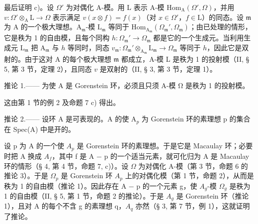 最后证明 c)。设 \(\Omega'\) 为对偶化 A-模。用 L 表示 A-模 \(\mathrm{Hom}_{\mathrm{A}}(\Omega',\Omega)\)，并用 \(v:\Omega' \otimes_{\mathrm{A}} \mathrm{L} \longrightarrow \Omega\) 表示满足 \(v(x \otimes f) = f(x)\)（对 \(x \in \Omega'\)，\(f \in \mathrm{L}\)）的同态。设 \(\mathfrak{m}\) 为 A 的一个极大理想。\(\mathrm{A}_{\mathfrak{m}}\)-模 \(\mathrm{L}_{\mathfrak{m}}\) 等同于 \(\mathrm{Hom}_{\mathrm{A}_{\mathfrak{m}}}(\Omega_{\mathfrak{m}}',\Omega_{\mathfrak{m}})\)；由已处理的情形，它是秩为 1 的自由模，且每个同构 \(h:\Omega_{\mathfrak{m}}' \to \Omega_{\mathfrak{m}}\) 都是它的一个生成元。当利用生成元 \(\mathrm{L}_{\mathfrak{m}}\) 把 \(\mathrm{A}_{\mathfrak{m}}\) 与 \(h\) 等同时，同态 \(v_{\mathfrak{m}}:\Omega_{\mathfrak{m}}' \otimes_{\mathrm{A}_{\mathfrak{m}}}\mathrm{L}_{\mathfrak{m}} \longrightarrow \Omega_{\mathfrak{m}}\) 等同于 \(h\)，因此它是双射的。由于这对 A 的每个极大理想 \(\mathfrak{m}\) 都成立，A-模 L 是秩为 1 的投射模（II, § 5, 第 3 节，定理 2），且同态 \(v\) 是双射的（II, § 3, 第 3 节，定理 1）。

推论 1.—— 为使 A 是 Gorenstein 环，必须且只须 A-模 Ω 是秩为 1 的投射模。

这由第 1 节的例 2 及命题 7 c) 得出。

推论 2.—— 设环 A 是可表现的。A 的使 A\(_{p}\) 为 Gorenstein 环的素理想 p 的集合在 Spec(A) 中是开的。

设 p 为 A 的一个使 \(A_{p}\) 是 Gorenstein 环的素理想。于是它是 Macaulay 环；必要时把 A 换成 \(A_{f}\)，其中 f 是 A − p 的一个适当元素，就可化归为 A 是 Macaulay 环的情形（§ 4, 第 4 节，命题 7, c)）。设 \(\Omega\) 为对偶化 A-模（第 3 节，命题 6 的推论 3）。于是 \(\Omega_{p}\) 是 Gorenstein 环 \(A_{p}\) 上的对偶化模（第 1 节，命题 2），从而是秩为 1 的自由模（推论 1）。因此存在 A − p 的一个元素 g，使 \(A_{g}\)-模 \(\Omega_{g}\) 是秩为 1 的自由模（II, § 5, 第 1 节，命题 2 的推论）。于是 \(A_{g}\) 是 Gorenstein 环（推论 1），且对 A 的每个不含 g 的素理想 q，\(A_{q}\) 亦然（§ 3, 第 7 节，例 1），这就证明了推论。

